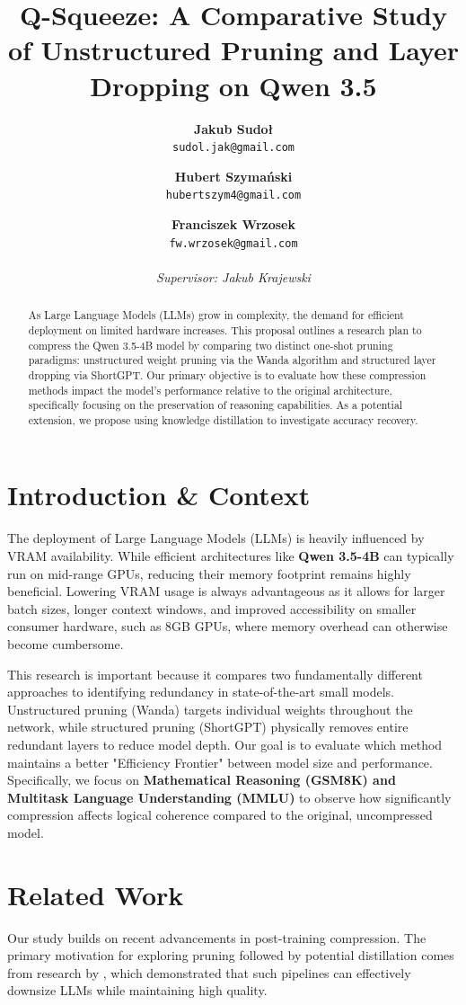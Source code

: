 \documentclass[11pt,a4paper,twocolumn]{article}
\title{\textbf{Q-Squeeze: A Comparative Study of Unstructured Pruning and Layer Dropping on Qwen 3.5}}
\author{
  \textbf{Jakub Sudoł} \\ \texttt{sudol.jak@gmail.com} \and
  \textbf{Hubert Szymański} \\ \texttt{hubertszym4@gmail.com} \and
  \textbf{Franciszek Wrzosek} \\ \texttt{fw.wrzosek@gmail.com} \\
  \\
  \textit{Supervisor: Jakub Krajewski}
}
\date{}
\begin{document}
\maketitle

\begin{abstract}
As Large Language Models (LLMs) grow in complexity, the demand for efficient deployment on limited hardware increases. This proposal outlines a research plan to compress the Qwen 3.5-4B model by comparing two distinct one-shot pruning paradigms: unstructured weight pruning via the Wanda algorithm and structured layer dropping via ShortGPT. Our primary objective is to evaluate how these compression methods impact the model's performance relative to the original architecture, specifically focusing on the preservation of reasoning capabilities. As a potential extension, we propose using knowledge distillation to investigate accuracy recovery.
\end{abstract}

\section{Introduction \& Context}
The deployment of Large Language Models (LLMs) is heavily influenced by VRAM availability. While efficient architectures like \textbf{Qwen 3.5-4B} can typically run on mid-range GPUs, reducing their memory footprint remains highly beneficial. Lowering VRAM usage is always advantageous as it allows for larger batch sizes, longer context windows, and improved accessibility on smaller consumer hardware, such as 8GB GPUs, where memory overhead can otherwise become cumbersome.

This research is important because it compares two fundamentally different approaches to identifying redundancy in state-of-the-art small models. Unstructured pruning (Wanda) targets individual weights throughout the network, while structured pruning (ShortGPT) physically removes entire redundant layers to reduce model depth. Our goal is to evaluate which method maintains a better "Efficiency Frontier" between model size and performance. Specifically, we focus on \textbf{Mathematical Reasoning (GSM8K) and Multitask Language Understanding (MMLU)} to observe how significantly compression affects logical coherence compared to the original, uncompressed model.

\section{Related Work}
Our study builds on recent advancements in post-training compression. The primary motivation for exploring pruning followed by potential distillation comes from research by \citet{muralidharan2024compact}, which demonstrated that such pipelines can effectively downsize LLMs while maintaining high quality.
\end{document}
